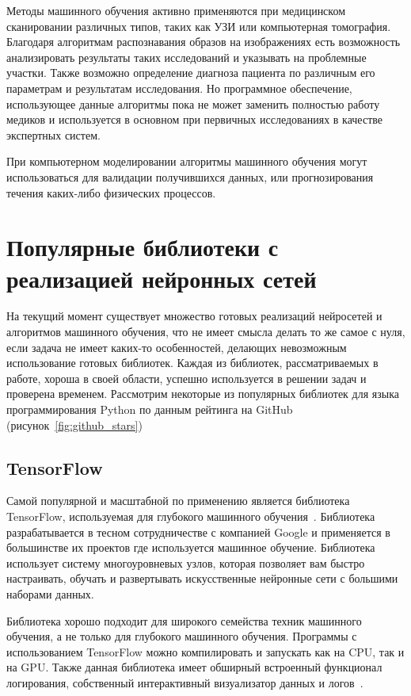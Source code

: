Методы машинного обучения активно применяются при медицинском сканировании различных типов, таких как УЗИ или компьютерная томография. Благодаря алгоритмам распознавания образов на изображениях есть возможность анализировать результаты таких исследований и указывать на проблемные участки. Также возможно определение диагноза пациента по различным его параметрам и результатам исследования. Но программное обеспечение, использующее данные алгоритмы пока не может заменить полностью работу медиков и используется в основном при первичных исследованиях в качестве экспертных систем.



При компьютерном моделировании алгоритмы машинного обучения могут использоваться для валидации получившихся данных, или прогнозирования течения каких-либо физических процессов.


\section{Популярные библиотеки с реализацией нейронных сетей}

На текущий момент существует множество готовых реализаций нейросетей и алгоритмов машинного обучения, что не имеет смысла делать то же самое с нуля, если задача не имеет каких-то особенностей, делающих невозможным использование готовых библиотек. Каждая из библиотек, рассматриваемых в работе, хороша в своей области, успешно используется в решении задач и проверена временем. Рассмотрим некоторые из популярных библиотек для языка программирования Python по данным рейтинга на GitHub (рисунок~\ref{fig:github_stars})



\subsection{TensorFlow}
Самой популярной и масштабной по применению является библиотека TensorFlow, используемая для глубокого машинного обучения~\cite{gudfellow}. Библиотека разрабатывается в тесном сотрудничестве с компанией Google и применяется в большинстве их проектов где используется машинное обучение. Библиотека использует систему многоуровневых узлов, которая позволяет вам быстро настраивать, обучать и развертывать искусственные нейронные сети с большими наборами данных.


Библиотека хорошо подходит для широкого семейства техник машинного обучения, а не только для глубокого машинного обучения. Программы с использованием TensorFlow можно компилировать и запускать как на CPU, так и на GPU. Также данная библиотека имеет обширный встроенный функционал логирования, собственный интерактивный визуализатор данных и логов~\cite{muller}.

